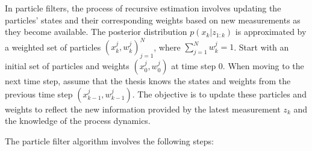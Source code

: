 In particle filters, the process of recursive estimation involves updating the particles' states and their corresponding weights based on new measurements as they become available.  The posterior distribution \( p(x_{k} | z_{1:k}) \) is approximated by a weighted set of particles \((x_{k}^{j}, w_k^{j})_{j=1}^N\), where \( \sum_{j=1}^N w_k^{j} = 1 \). Start with an initial set of particles and weights \((x_0^{j}, w_0^{j})\) at time step \(0\). When moving to the next time step, assume that the thesis knows the states and weights from the previous time step \((x_{k-1}^{j}, w_{k-1}^{j})\). The objective is to update these particles and weights to reflect the new information provided by the latest measurement \(z_k\) and the knowledge of the process dynamics.

The particle filter algorithm involves the following steps:
